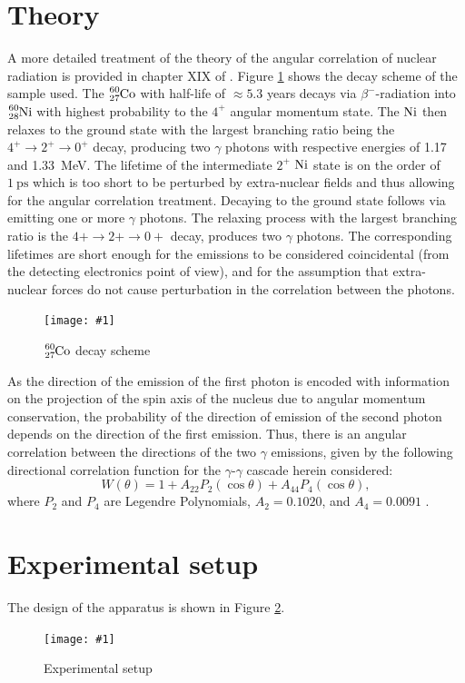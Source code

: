 \documentclass[twocolumn]{article}
\newcommand{\insertFigure}[1]{%
   \texttt{[image: \#1]}%
}
\begin{document}
\section{Theory}
A more detailed treatment of the theory of the angular correlation of nuclear radiation is provided in chapter XIX of \cite{sieg}. Figure \ref{fig:cobalt_scheme} shows the decay scheme of the sample used. The $\ce{_27^{60}Co}$ with half-life of $\approx 5.3$ years decays via $\beta^-$-radiation into $\ce{_28^{60}Ni}$ with highest probability to the $4^+$ angular momentum state.
The $\ce{Ni}$ then relaxes to the ground state with the largest branching ratio being the $4^+\rightarrow2^+\rightarrow 0^+$ decay, producing two $\gamma$ photons with respective energies of 1.17 and 1.33~MeV. The lifetime of the intermediate $2^+$ $\ce{Ni}$ state is on the order of $\SI{1}{\pico\second}$ which is too short to be perturbed by extra-nuclear fields and thus allowing for the angular correlation treatment.
Decaying to the ground state follows via emitting one or more $\gamma$ photons. The relaxing process with the largest branching ratio is the $4+ \rightarrow 2+ \rightarrow 0+$ decay, produces two $\gamma$ photons. The corresponding lifetimes are short enough for the emissions to be considered coincidental (from the detecting electronics point of view), and for the assumption that extra-nuclear forces do not cause perturbation in the correlation between the photons.
\begin{figure}[!h]
\centering
\insertFigure{cobalt_scheme.png}
\caption{$\ce{_27^{60}Co}$ decay scheme \cite{cobalt_scheme}}
\label{fig:cobalt_scheme}
\end{figure}
As the direction of the emission of the first photon is encoded with information on the projection of the spin axis of the nucleus due to angular momentum conservation, the probability of the direction of emission of the second photon depends on the direction of the first emission. Thus, there is an angular correlation between the directions of the two $\gamma$ emissions, given by the following directional correlation function for the $\gamma$-$\gamma$ cascade herein considered:
\[W(\theta) = 1+A_{22}P_2(\cos{\theta})+A_{44}P_4(\cos{\theta}),\]
where $P_2$ and $P_4$ are Legendre Polynomials, $A_2 = 0.1020$, and $A_4 = 0.0091$ \cite{sieg}.

\section{Experimental setup}
The design of the apparatus is shown in Figure \ref{fig:exp_setup}.
\begin{figure}[!h]
\centering
\insertFigure{k223_setup.png}
\caption{Experimental setup \cite{booklet}}
\label{fig:exp_setup}
\end{figure}
\end{document}

